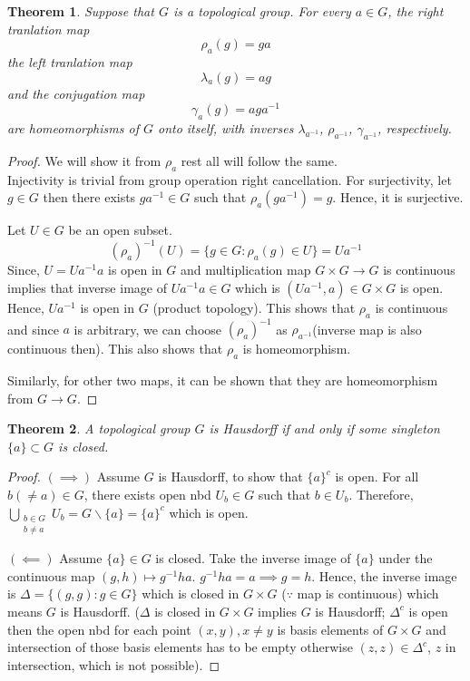 \documentclass[12pt,reqno]{amsart}
\theoremstyle{plain}
\newtheorem{thm}{Theorem}
\theoremstyle{definition}
\begin{document}
\begin{thm}
    Suppose that $G$ is a topological group. For every $a \in G$, the {\it right tranlation map}
    $$ \rho_a(g) = ga$$
    the {\it left tranlation map}
    $$ \lambda_a(g) = ag$$
    and the {\it conjugation map}
    $$ \gamma_a(g) = aga^{-1}$$
    are homeomorphisms of $G$ onto itself, with inverses $\lambda_{a^{-1}}$, $\rho_{a^{-1}}$, $\gamma_{a^{-1}}$, respectively.
\end{thm}
\begin{proof}
    We will show it from $\rho_a$ rest all will follow the same.\\
    Injectivity is trivial from group operation right cancellation. For surjectivity, let $g \in G$ then there exists $ga^{-1}\in G$ such that $\rho_a(ga^{-1}) = g$. Hence, it is surjective.

    Let $U \in G$ be an open subset. 
    $$ (\rho_a)^{-1}(U) = \{g \in G \colon \rho_a(g) \in U\} = Ua^{-1}$$
    Since, $U = Ua^{-1}a$ is open in $G$ and multiplication map $G \times G \to G$ is continuous implies that inverse image of $Ua^{-1}a \in G$ which is $(Ua^{-1},a) \in G \times G$ is open. Hence, $Ua^{-1}$ is open in $G$ (product topology). This shows that $\rho_a$ is continuous and since $a$ is arbitrary, we can choose $(\rho_a)^{-1}$ as $\rho_{a^{-1}}$(inverse map is also continuous then). This also shows that $\rho_a$ is homeomorphism.

    Similarly, for other two maps, it can be shown that they are homeomorphism from $G \to G$.
\end{proof}

\begin{thm}
    A topological group $G$ is Hausdorff if and only if some singleton $\{a\} \subset G$ is closed.
\end{thm}
\begin{proof}
    $(\implies)$ Assume $G$ is Hausdorff, to show that $\{a\}^c$ is open. For all $b(\neq a) \in G$, there exists open nbd $U_b \in G$ such that $b \in U_b$. Therefore, $\bigcup\limits_{\substack{b\in G \\ b \neq a}} U_b = G\backslash\{a\} = \{a\}^c$ which is open.

    $(\impliedby)$ Assume $\{a\} \in G$ is closed. Take the inverse image of $\{a\}$ under the continuous map $(g,h) \mapsto g^{-1}ha$. $g^{-1}ha = a \implies g = h$. Hence, the inverse image is $\Delta = \{(g,g) \colon g \in G\}$ which is closed in $G \times G$ ($\because$ map is continuous) which means $G$ is Hausdorff. ($\Delta$ is closed in $G \times G$ implies $G$ is Hausdorff; $\Delta^c$ is open then the open nbd for each point $(x,y), x \neq y$ is basis elements of $G \times G$ and intersection of those basis elements has to be empty otherwise $(z,z) \in \Delta^c$, $z$ in intersection, which is not possible).
\end{proof}
\end{document}
